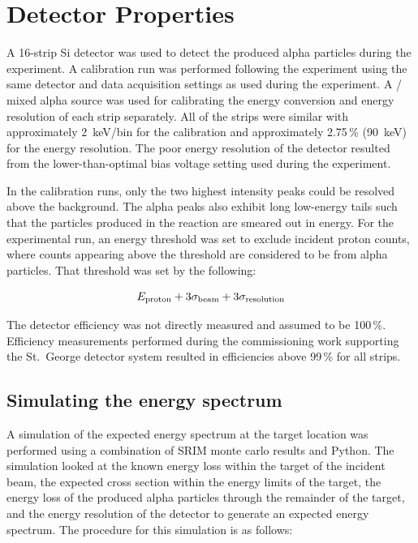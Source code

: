 \section{Detector Properties}
\label{sec:detector-properties}

A 16-strip Si detector was used to detect the produced alpha particles
during the experiment. A calibration run was performed following the
experiment using the same detector and data acquisition settings as used
during the experiment. A / mixed alpha source
was used for calibrating the energy conversion and energy resolution of
each strip separately. All of the strips were similar with approximately
2~keV/bin for the calibration and approximately 2.75\,\% (90~keV) for
the energy resolution. The poor energy resolution of the detector
resulted from the lower-than-optimal bias voltage setting used during
the experiment.

In the calibration runs, only the two highest intensity peaks could be
resolved above the background. The alpha peaks also exhibit long
low-energy tails such that the particles produced in the \alpa{}
reaction are smeared out in energy. For the experimental run, an energy
threshold was set to exclude incident proton counts, where counts
appearing above the threshold are considered to be from alpha particles.
That threshold was set by the following:

\begin{equation}
    E_{\rm proton} + 3 \sigma_{\rm beam} + 3 \sigma_{\rm resolution}
\end{equation}

The detector efficiency was not directly measured and assumed to be
100\,\%. Efficiency measurements performed during the commissioning work
supporting the St.\ George detector system resulted in efficiencies
above 99\,\% for all strips.

\subsection{Simulating the energy spectrum}
\label{sec:05-simulating-spectrum}

A simulation of the expected energy spectrum at the target location was
performed using a combination of SRIM monte carlo results and Python.
The simulation looked at the known energy loss within the target of the
incident beam, the expected cross section within the energy limits of
the target, the energy loss of the produced alpha particles through the
remainder of the target, and the energy resolution of the detector to
generate an expected energy spectrum. The procedure for this simulation
is as follows:


